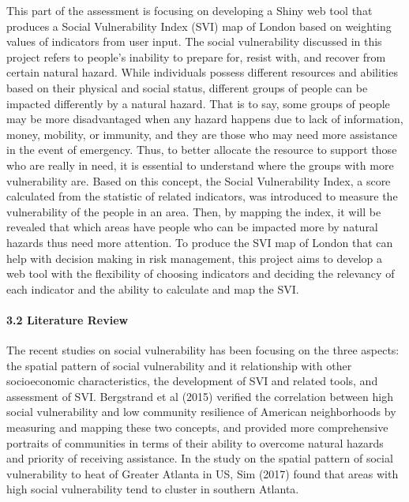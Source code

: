 \documentclass[]{article}
\let\oldparagraph\paragraph
\renewcommand{\paragraph}[1]{\oldparagraph{#1}\mbox{}}
\begin{document}
This part of the assessment is focusing on developing a Shiny web tool
that produces a Social Vulnerability Index (SVI) map of London based on
weighting values of indicators from user input. The social vulnerability
discussed in this project refers to people's inability to prepare for,
resist with, and recover from certain natural hazard. While individuals
possess different resources and abilities based on their physical and
social status, different groups of people can be impacted differently by
a natural hazard. That is to say, some groups of people may be more
disadvantaged when any hazard happens due to lack of information, money,
mobility, or immunity, and they are those who may need more assistance
in the event of emergency. Thus, to better allocate the resource to
support those who are really in need, it is essential to understand
where the groups with more vulnerability are. Based on this concept, the
Social Vulnerability Index, a score calculated from the statistic of
related indicators, was introduced to measure the vulnerability of the
people in an area. Then, by mapping the index, it will be revealed that
which areas have people who can be impacted more by natural hazards thus
need more attention. To produce the SVI map of London that can help with
decision making in risk management, this project aims to develop a web
tool with the flexibility of choosing indicators and deciding the
relevancy of each indicator and the ability to calculate and map the
SVI.

\paragraph{3.2 Literature Review}\label{literature-review}

The recent studies on social vulnerability has been focusing on the
three aspects: the spatial pattern of social vulnerability and it
relationship with other socioeconomic characteristics, the development
of SVI and related tools, and assessment of SVI. Bergstrand et al (2015)
verified the correlation between high social vulnerability and low
community resilience of American neighborhoods by measuring and mapping
these two concepts, and provided more comprehensive portraits of
communities in terms of their ability to overcome natural hazards and
priority of receiving assistance. In the study on the spatial pattern of
social vulnerability to heat of Greater Atlanta in US, Sim (2017) found
that areas with high social vulnerability tend to cluster in southern
Atlanta.
\end{document}
